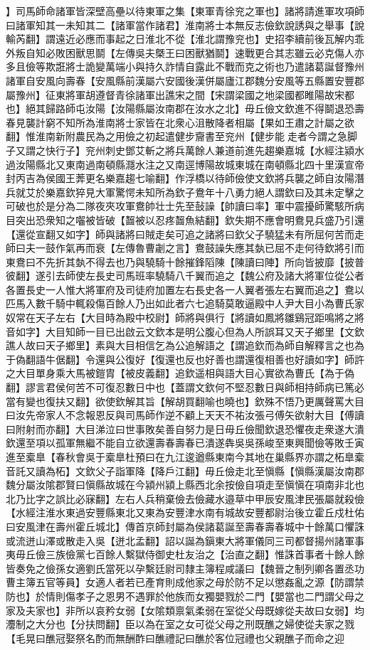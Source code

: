 】司馬師命諸軍皆深壁高壘以待東軍之集【東軍青徐兖之軍也】諸將請進軍攻項師曰諸軍知其一未知其二【諸軍當作諸君】淮南將士本無反志儉欽說誘與之舉事【說輸芮翻】謂遠近必應而事起之日淮北不從【淮北謂豫兖也】史招李續前後瓦解内乖外叛自知必敗困獸思鬬【左傳吳夫槩王曰困獸猶鬬】速戰更合其志雖云必克傷人亦多且儉等欺誑將士詭變萬端小與持久詐情自露此不戰而克之術也乃遣諸葛誕督豫州諸軍自安風向壽春【安風縣前漢屬六安國後漢併屬廬江郡魏分安風等五縣置安豐郡屬豫州】征東將軍胡遵督青徐諸軍出譙宋之間【宋謂梁國之地梁國都睢陽故宋都也】絕其歸路師屯汝陽【汝陽縣屬汝南郡在汝水之北】毋丘儉文欽進不得鬬退恐壽春見襲計窮不知所為淮南將士家皆在北衆心沮散降者相屬【果如王肅之計屬之欲翻】惟淮南新附農民為之用儉之初起遣健步齎書至兖州【健步能走者今謂之急脚子又謂之快行子】兖州刺史鄧艾斬之將兵萬餘人兼道前進先趨樂嘉城【水經注潁水過汝陽縣北又東南過南頓縣㶏水注之又南逕博陽故城東城在南頓縣北四十里漢宣帝封丙吉為侯國王莾更名樂嘉趨七喻翻】作浮橋以待師儉使文欽將兵襲之師自汝陽潛兵就艾於樂嘉欽猝見大軍驚愕未知所為欽子鴦年十八勇力絕人謂欽曰及其未定擊之可破也於是分為二隊夜夾攻軍鴦帥壮士先至鼔譟【帥讀曰率】軍中震擾師驚駭所病目突出恐衆知之囓被皆破【齧被以忍疼齧魚結翻】欽失期不應會明鴦見兵盛乃引還【還從宣翻又如字】師與諸將曰賊走矣可追之諸將曰欽父子驍猛未有所屈何苦而走師曰夫一鼓作氣再而衰【左傳魯曹劌之言】鴦鼓譟失應其埶已屈不走何待欽將引而東鴦曰不先折其埶不得去也乃與驍騎十餘摧鋒䧟陳【陳讀曰陣】所向皆披靡【披普彼翻】遂引去師使左長史司馬班率驍騎八千翼而追之【魏公府及諸大將軍位從公者各置長史一人惟大將軍府及司徒府加置左右長史各一人翼者張左右翼而追之】鴦以匹馬入數千騎中輒殺傷百餘人乃出如此者六七追騎莫敢逼殿中人尹大目小為曹氏家奴常在天子左右【大目時為殿中校尉】師將與俱行【將讀如鳳將雛鷄冠距鳴將之將音如字】大目知師一目已出啟云文欽本是明公腹心但為人所誤耳又天子鄉里【文欽譙人故曰天子鄉里】素與大目相信乞為公追解語之【謂追欽而為師自解釋言之也為于偽翻語牛倨翻】令還與公復好【復還也反也好善也謂還復相善也好讀如字】師許之大目單身乘大馬被鎧胄【被皮義翻】追欽遥相與語大目心實欲為曹氏【為于偽翻】謬言君侯何苦不可復忍數日中也【蓋謂文欽何不堅忍數日與師相持師病已篤必當有變也復扶又翻】欲使欽解其旨【解胡買翻喻也曉也】欽殊不悟乃更厲聲罵大目曰汝先帝家人不念報恩反與司馬師作逆不顧上天天不祐汝張弓傅矢欲射大目【傅讀曰附射而亦翻】大目涕泣曰世事敗矣善自努力是日毋丘儉聞欽退恐懼夜走衆遂大潰欽還至項以孤軍無繼不能自立欲還壽春壽春已潰遂犇吳吳孫峻至東興聞儉等敗壬寅進至槖臯【春秋會吳于槖臯杜預曰在九江逡遒縣東南今其地在巢縣界亦謂之柘臯槖音託又讀為柘】文欽父子詣軍降【降戶江翻】毋丘儉走北至愼縣【愼縣漢屬汝南郡魏分屬汝隂郡賢曰愼縣故城在今潁州潁上縣西北余按儉自項走至愼愼在項南非北也北乃比字之誤比必寐翻】左右人兵稍棄儉去儉藏水邉草中甲辰安風津民張屬就殺儉【水經注淮水東過安豐縣東北又東為安豐津水南有城故安豐都尉治後立霍丘戍杜佑曰安風津在壽州霍丘城北】傳首京師封屬為侯諸葛誕至壽春壽春城中十餘萬口懼誅或流迸山澤或散走入吳【迸北孟翻】詔以誕為鎭東大將軍儀同三司都督揚州諸軍事夷毋丘儉三族儉黨七百餘人繫獄侍御史杜友治之【治直之翻】惟誅首事者十餘人餘皆奏免之儉孫女適劉氏當死以孕繫廷尉司隸主簿程咸議曰【魏晉之制列卿各置丞功曹主簿五官等員】女適人者若已產育則成他家之母於防不足以懲姦亂之源【防謂禁防也】於情則傷孝子之恩男不遇罪於他族而女獨嬰戮於二門【嬰當也二門謂父母之家及夫家也】非所以哀矜女弱【女隂類禀氣柔弱在室從父母既嫁從夫故曰女弱】均灋制之大分也【分扶問翻】臣以為在室之女可從父母之刑既醮之婦使從夫家之戮【毛晃曰醮冠娶祭名酌而無酬酢曰醮禮記曰醮於客位冠禮也父親醮子而命之迎